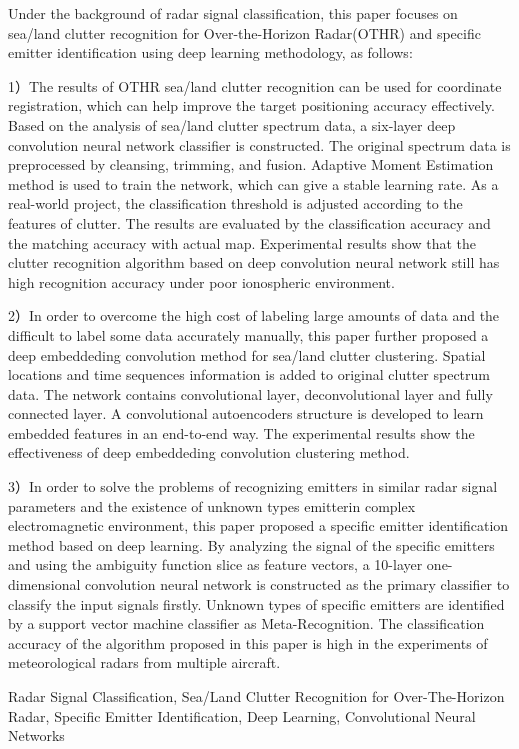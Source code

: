 
\begin{Abstract}
Under the background of radar signal classification, this paper focuses on sea/land clutter recognition for Over-the-Horizon Radar(OTHR) and specific emitter identification using deep learning methodology, as follows:


1）The results of OTHR sea/land clutter recognition can be used for coordinate registration, which can help improve the target positioning accuracy effectively.
Based on the analysis of sea/land clutter spectrum data, a six-layer deep convolution neural network classifier is constructed. The original spectrum data is preprocessed by cleansing, trimming, and fusion.
Adaptive Moment Estimation method is used to train the network, which can give a stable learning rate.
As a real-world project, the classification threshold is adjusted according to the features of clutter. The results are evaluated by the classification accuracy and the matching accuracy with actual map.
Experimental results show that the clutter recognition algorithm based on deep convolution neural network still has high recognition accuracy under poor ionospheric environment.

2）In order to overcome the high cost of labeling large amounts of data and the difficult to label some data  accurately manually, this paper further proposed a deep embeddeding convolution method for sea/land clutter clustering.
Spatial locations and time sequences information is added to original clutter spectrum data. The network contains convolutional layer, deconvolutional layer and fully connected layer.
A convolutional autoencoders structure is developed to learn embedded features in an end-to-end way.
The experimental results show the effectiveness of deep embeddeding convolution clustering method.

3）In order to solve the problems of recognizing emitters in similar radar signal parameters and the existence of unknown types emitterin complex electromagnetic environment, this paper proposed a specific emitter identification method based on deep learning.
By analyzing the signal of the specific emitters and using the ambiguity function slice as feature vectors,
a 10-layer one-dimensional convolution neural network is constructed as the primary classifier to classify the input signals firstly. Unknown types of specific emitters are identified by a support vector machine classifier as Meta-Recognition.
The classification accuracy of the algorithm proposed in this paper is high in the experiments of meteorological radars from multiple aircraft.



	\begin{Keywords}
		Radar Signal Classification, Sea/Land Clutter Recognition for Over-The-Horizon Radar, Specific Emitter Identification, Deep Learning, Convolutional Neural Networks
	\end{Keywords}
\end{Abstract}